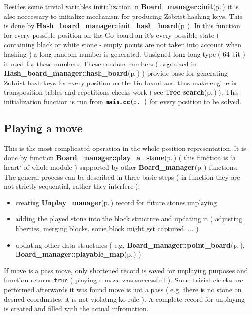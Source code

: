Besides some trivial variables initialization in {\bf Board\_\-manager::init}{\rm (p.\,\pageref{classBoard__manager_a0})} it is also neccessary to initialize mechanism for producing Zobrist hashing keys. This is done by {\bf Hash\_\-board\_\-manager::init\_\-hash\_\-board}{\rm (p.\,\pageref{classHash__board__manager_a7})}. In this function for every possible position on the Go board an it's every possible state ( containing black or white stone - empty points are not taken into account when hashing ) a long random number is generated. Unsigned long long type ( 64 bit ) is used for these numbers. These random numbers ( organized in {\bf Hash\_\-board\_\-manager::hash\_\-board}{\rm (p.\,\pageref{classHash__board__manager_r0})} ) provide base for generating Zobrist hash keys for every position on the Go board and thus make engine in transposition tables and repetitions checks work ( see {\bf Tree search}{\rm (p.\,\pageref{page_3})} ). This initialization function is run from {\tt {\bf main.cc}{\rm (p.\,\pageref{main_8cc})}} for every position to be solved.\subsection{Playing a move}\label{page_6_page_6__sec_3}
This is the most complicated operation in the whole position representation. It is done by function {\bf Board\_\-manager::play\_\-a\_\-stone}{\rm (p.\,\pageref{classBoard__manager_a4})} ( this function is \char`\"{}a heart\char`\"{} of whole module ) supported by other {\bf Board\_\-manager}{\rm (p.\,\pageref{classBoard__manager})} functions. The general process can be described in three basic steps ( in function they are not strictly sequential, rather they interfere ):\begin{itemize}
\item creating {\bf Unplay\_\-manager}{\rm (p.\,\pageref{structUnplay__manager})} record for future stones unplaying\item adding the played stone into the block structure and updating it ( adjusting liberties, merging blocks, some block might get captured, ... )\item updating other data structures ( e.g. {\bf Board\_\-manager::point\_\-board}{\rm (p.\,\pageref{classBoard__manager_o5})}, {\bf Board\_\-manager::playable\_\-map}{\rm (p.\,\pageref{classBoard__manager_r2})} )\end{itemize}


If move is a pass move, only shortened record is saved for unplaying purposes and function returns {\tt true} ( playing a move was successfull ). Some trivial checks are performed afterwards it was found move is not a pass ( e.g. there is no stone on desired coordinates, it is not violating ko rule ). A complete record for unplaying is created and filled with the actual infromation.



